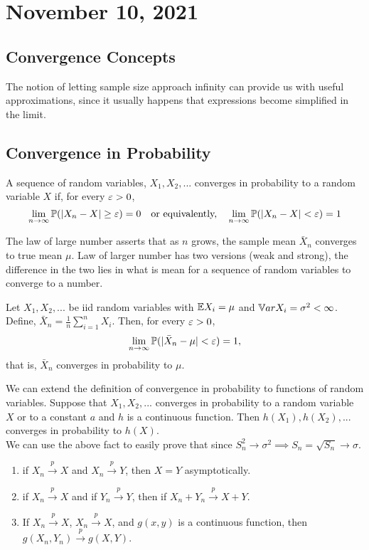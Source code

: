 \section{November 10, 2021}
\subsection{Convergence Concepts}
The notion of letting sample size approach infinity can provide us with useful approximations, since it usually happens that expressions become simplified in the limit. 
\\
\subsection{Convergence in Probability}
\begin{definition}
    A sequence of random variables, $X_1,X_2,...$ converges in probability to a random variable $X$ if, for every $\varepsilon > 0$,
    $$
    \lim_{n \to \infty}\mathbb P(|X_n -X| \geq \varepsilon) = 0  \quad \text{or equivalently,} \quad  \lim_{n \to \infty}\mathbb P(|X_n -X| < \varepsilon) = 1
    $$
\end{definition}
The law of large number asserts that as $n$ grows, the sample mean $\bar{X}_n$ converges to true mean $\mu$. Law of larger number has two versions (weak and strong), the difference in the two lies in what is mean for a sequence of random variables to converge to a number. 

\begin{theorem}
    Let $X_1,X_2,...$ be iid random variables with $\mathbb E X_i = \mu$ and $\mathbb V ar X_i = \sigma^2 < \infty$. Define, $\bar{X}_n = \frac{1}{n}\sum_{i=1}^{n}X_i$. Then, for every $\varepsilon > 0$,
    $$
    \lim_{n \to \infty} \mathbb P(|\bar{X}_n - \mu| < \varepsilon ) = 1,
    $$
    that is, $\bar{X}_n$ converges in probability to $\mu$.
\end{theorem}
We can extend the definition of convergence in probability to functions of random variables. Suppose that $X_1,X_2,...$ converges in probability to a random variable $X$ or to a constant $a$ and $h$ is a continuous function. Then $h(X_1), h(X_2),...$ converges in probability to $h(X)$.
\\
We can use the above fact to easily prove that since $S_n^2 \to \sigma^2 \implies S_n = \sqrt{S_n} \to \sigma$.
\begin{note}
    \begin{enumerate}
        \item if $X_n \xrightarrow{p} X$ and $X_n \xrightarrow{p} Y$, then $X =Y$ asymptotically. 
        \item if $X_n \xrightarrow{p} X$ and if $Y_n \xrightarrow{p} Y$, then if $X_n +Y_n \xrightarrow{p} X + Y$.
        \item If $X_n \xrightarrow{p} X$, $X_n \xrightarrow{p} X$, and $g(x,y)$ is a continuous function, then $g(X_n,Y_n) \xrightarrow{p} g(X,Y)$. 
    \end{enumerate}
\end{note}
